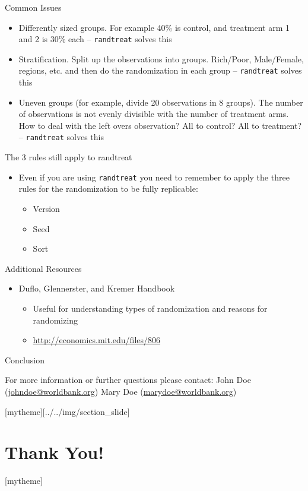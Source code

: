 \documentclass[aspectratio=169]{beamer}
\newcommand{\sectionpic}[2]{
	\setbeamertemplate{section page}[mytheme][#2]
	\section{#1}
	\setbeamertemplate{section page}[mytheme]
}
\begin{document}
\begin{frame}{Common Issues}
	\begin{itemize}
		\item Differently sized groups. For example 40\% is control, and treatment arm 1 and 2 is 30\% each – \texttt{randtreat} solves this
		\item Stratification. Split up the observations into groups. Rich/Poor, Male/Female, regions, etc. and then do the randomization in each group – \texttt{randtreat} solves this
		\item Uneven groups (for example, divide 20 observations in 8 groups). The number of observations is not evenly divisible with the number of treatment arms. How to deal with the left overs observation? All to control? All to treatment? – \texttt{randtreat} solves this
	\end{itemize}
\end{frame}



\begin{frame}{The 3 rules still apply to randtreat}
	\begin{itemize}
		\item Even if you are using \texttt{randtreat} you need to remember to apply the three rules for the randomization to be fully replicable:
		\begin{itemize}
			\item Version
			\item Seed
			\item Sort
		\end{itemize}
	\end{itemize}
\end{frame}


\begin{frame}{Additional Resources}
	\begin{itemize}
		\item Duflo, Glennerster, and Kremer Handbook
		\begin{itemize}
			\item Useful for understanding types of randomization and reasons for randomizing
			\item \url{http://economics.mit.edu/files/806}
		\end{itemize}
	\end{itemize}
\end{frame}


\begin{frame}{Conclusion}


\vspace{20mm}
For more information or further questions please contact:
\newline John Doe (\url{johndoe@worldbank.org}) \newline Mary Doe (\url{marydoe@worldbank.org})

\end{frame}

\sectionpic{Thank You!}{../../img/section_slide}
\end{document}
